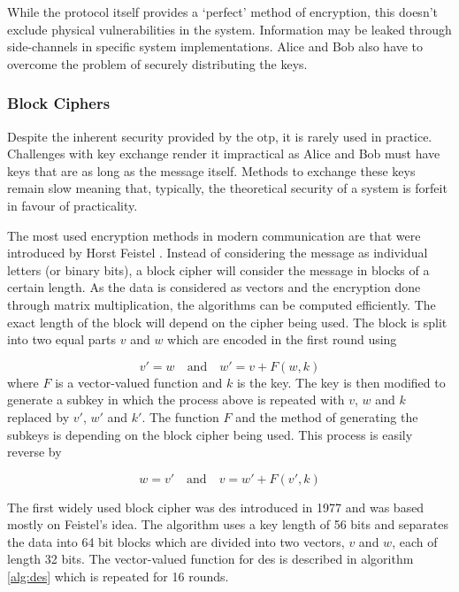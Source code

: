 
While the protocol itself provides a `perfect' method of encryption, this doesn't exclude physical vulnerabilities in the system. Information may be leaked through side-channels in specific system implementations. Alice and Bob also have to overcome the problem of securely distributing the keys. 

\subsubsection{Block Ciphers}

Despite the inherent security provided by the \ac{otp}, it is rarely used in practice. Challenges with key exchange render it impractical as Alice and Bob must have keys that are as long as the message itself. Methods to exchange these keys remain slow meaning that, typically, the theoretical security of a system is forfeit in favour of practicality. 

The most used encryption methods in modern communication are  that were introduced by Horst Feistel \cite{feistel1970cryptographic}. Instead of considering the message as individual letters (or binary bits), a block cipher will consider the message in blocks of a certain length. As the data is considered as vectors and the encryption done through matrix multiplication, the algorithms can be computed efficiently. The exact length of the block will depend on the cipher being used. The block is split into two equal parts $v$ and $w$ which are encoded in the first round using 

\begin{equation}
	v' = w \quad \text{and} \quad w' = v + F(w, k)
\end{equation}
where $F$ is a vector-valued function and $k$ is the key. The key is then modified to generate a subkey in which the process above is repeated with $v$, $w$ and $k$ replaced by $v'$, $w'$ and $k'$. The function $F$ and the method of generating the subkeys is depending on the block cipher being used. This process is easily reverse by

\begin{equation}
	w = v' \quad \text{and} \quad v = w' + F(v', k)
\end{equation}

The first widely used block cipher was \ac{des} introduced in 1977 \cite{DES1977} and was based mostly on Feistel's idea. The algorithm uses a key length of 56 bits and separates the data into 64 bit blocks which are divided into two vectors, $v$ and $w$, each of length 32 bits. The vector-valued function for \ac{des} is described in algorithm \ref{alg:des} which is repeated for 16 rounds.

